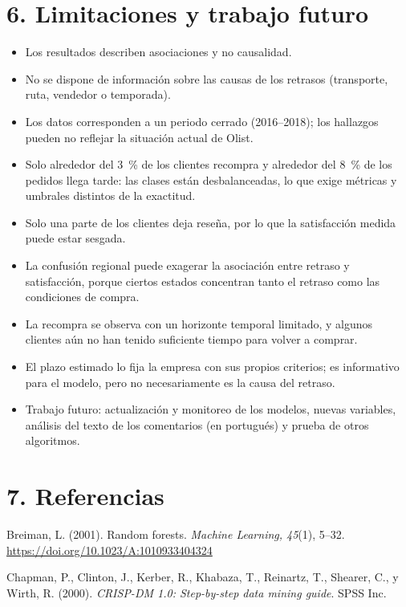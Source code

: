\documentclass[a4paper,stu,12pt,donotrepeattitle,floatsintext]{apa7}
\begin{document}
\section{6. Limitaciones y trabajo futuro}
\begin{itemize}
\item Los resultados describen asociaciones y no causalidad.
\item No se dispone de información sobre las causas de los retrasos (transporte, ruta, vendedor o temporada).
\item Los datos corresponden a un periodo cerrado (2016–2018); los hallazgos pueden no reflejar la situación actual de Olist.
\item Solo alrededor del 3~\% de los clientes recompra y alrededor del 8~\% de los pedidos llega tarde: las clases están desbalanceadas, lo que exige métricas y umbrales distintos de la exactitud.
\item Solo una parte de los clientes deja reseña, por lo que la satisfacción medida puede estar sesgada.
\item La confusión regional puede exagerar la asociación entre retraso y satisfacción, porque ciertos estados concentran tanto el retraso como las condiciones de compra.
\item La recompra se observa con un horizonte temporal limitado, y algunos clientes aún no han tenido suficiente tiempo para volver a comprar.
\item El plazo estimado lo fija la empresa con sus propios criterios; es informativo para el modelo, pero no necesariamente es la causa del retraso.
\item Trabajo futuro: actualización y monitoreo de los modelos, nuevas variables, análisis del texto de los comentarios (en portugués) y prueba de otros algoritmos.
\end{itemize}
\clearpage
\section{7. Referencias}
{\hangindent=0.5in\noindent Breiman, L. (2001). Random forests. \emph{Machine Learning, 45}(1), 5--32. \url{https://doi.org/10.1023/A:1010933404324}\par}

{\hangindent=0.5in\noindent Chapman, P., Clinton, J., Kerber, R., Khabaza, T., Reinartz, T., Shearer, C., y Wirth, R. (2000). \emph{CRISP-DM 1.0: Step-by-step data mining guide}. SPSS Inc.\par}
\end{document}
